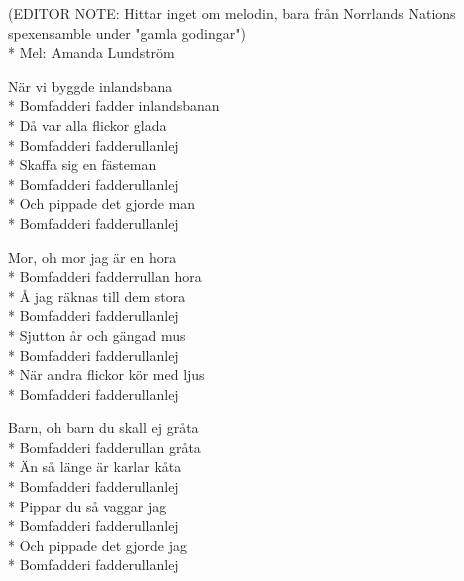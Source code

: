 \begin{SongText}[Inlandsbanan]
    \begin{SongInfo}
        (EDITOR NOTE: Hittar inget om melodin, bara från Norrlands Nations spexensamble under "gamla godingar")\\*%
        Mel: Amanda Lundström
    \end{SongInfo}
    \begin{SongVerse}
        När vi byggde inlandsbana\\*%
        Bomfadderi fadder inlandsbanan\\*%
        Då var alla flickor glada\\*%
        Bomfadderi fadderullanlej\\*%
        Skaffa sig en fästeman\\*%
        Bomfadderi fadderullanlej\\*%
        Och pippade det gjorde man \\*%
        Bomfadderi fadderullanlej
    \end{SongVerse}
    \begin{SongVerse}
        Mor, oh mor jag är en hora\\*%
        Bomfadderi fadderrullan hora\\*%
        Å jag räknas till dem stora\\*%
        Bomfadderi fadderullanlej\\*%
        Sjutton år och gängad mus\\*%
        Bomfadderi fadderullanlej\\*%
        När andra flickor kör med ljus\\*%
        Bomfadderi fadderullanlej
    \end{SongVerse}
    \begin{SongVerse}
        Barn, oh barn du skall ej gråta\\*%
        Bomfadderi fadderullan gråta\\*%
        Än så länge är karlar kåta\\*%
        Bomfadderi fadderullanlej\\*%
        Pippar du så vaggar jag\\*%
        Bomfadderi fadderullanlej\\*%
        Och pippade det gjorde jag\\*%
        Bomfadderi fadderullanlej
    \end{SongVerse}
\end{SongText}

